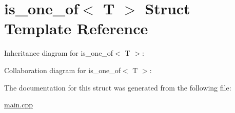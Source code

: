 \hypertarget{structis__one__of_3_01T_01_4}{}\section{is\+\_\+one\+\_\+of$<$ T $>$ Struct Template Reference}
\label{structis__one__of_3_01T_01_4}


Inheritance diagram for is\+\_\+one\+\_\+of$<$ T $>$\+:


Collaboration diagram for is\+\_\+one\+\_\+of$<$ T $>$\+:


The documentation for this struct was generated from the following file\+:\begin{DoxyCompactItemize}
\item 
\hyperlink{main_8cpp}{main.\+cpp}\end{DoxyCompactItemize}

